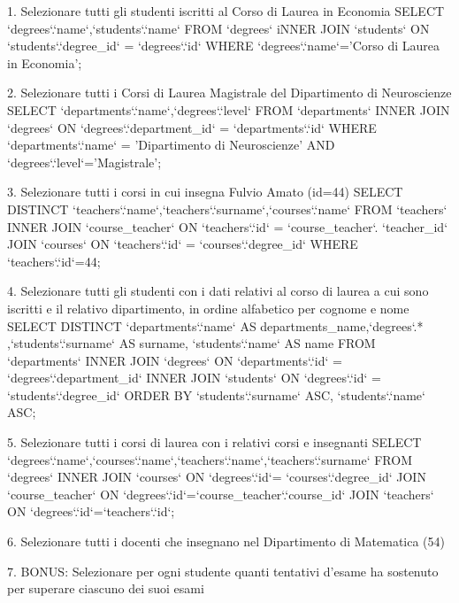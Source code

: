 1. Selezionare tutti gli studenti iscritti al Corso di Laurea in Economia
SELECT `degrees`.`name`,`students`.`name` FROM `degrees` iNNER JOIN `students` ON `students`.`degree_id` = `degrees`.`id` WHERE `degrees`.`name`='Corso di Laurea in Economia';


2. Selezionare tutti i Corsi di Laurea Magistrale del Dipartimento di Neuroscienze
SELECT `departments`.`name`,`degrees`.`level` FROM `departments` INNER JOIN `degrees` ON `degrees`.`department_id` = `departments`.`id` WHERE `departments`.`name` = 'Dipartimento di Neuroscienze' AND `degrees`.`level`='Magistrale';

3. Selezionare tutti i corsi in cui insegna Fulvio Amato (id=44)
SELECT DISTINCT `teachers`.`name`,`teachers`.`surname`,`courses`.`name` FROM `teachers` INNER JOIN `course_teacher` ON `teachers`.`id` = `course_teacher`. `teacher_id` JOIN `courses` ON `teachers`.`id` = `courses`.`degree_id` WHERE `teachers`.`id`=44;

4. Selezionare tutti gli studenti con i dati relativi al corso di laurea a cui sono iscritti e il
relativo dipartimento, in ordine alfabetico per cognome e nome
SELECT DISTINCT `departments`.`name` AS departments_name,`degrees`.* ,`students`.`surname` AS surname, `students`.`name` AS name FROM `departments` INNER JOIN `degrees` ON `departments`.`id` = `degrees`.`department_id` INNER JOIN `students` ON `degrees`.`id` = `students`.`degree_id` ORDER BY `students`.`surname` ASC, `students`.`name` ASC;

5. Selezionare tutti i corsi di laurea con i relativi corsi e insegnanti
SELECT `degrees`.`name`,`courses`.`name`,`teachers`.`name`,`teachers`.`surname` FROM `degrees` INNER JOIN `courses` ON `degrees`.`id`= `courses`.`degree_id` JOIN `course_teacher` ON `degrees`.`id`=`course_teacher`.`course_id` JOIN `teachers` ON `degrees`.`id`=`teachers`.`id`;


6. Selezionare tutti i docenti che insegnano nel Dipartimento di Matematica (54)


7. BONUS: Selezionare per ogni studente quanti tentativi d’esame ha sostenuto per
superare ciascuno dei suoi esami
